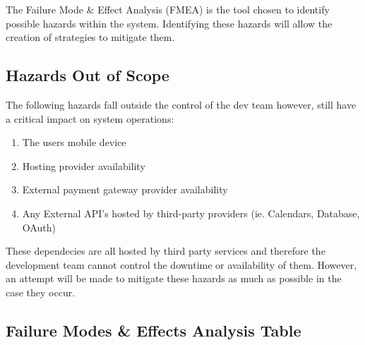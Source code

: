 \documentclass{article}
\begin{document}
The Failure Mode \& Effect Analysis (FMEA) is the tool chosen to identify possible hazards within the system. Identifying these hazards will allow the creation of strategies to mitigate them.

\subsection{Hazards Out of Scope}
The following hazards fall outside the control of the dev team however, still have a critical impact on system operations:
\begin{enumerate}
    \item The users mobile device
    \item Hosting provider availability
    \item External payment gateway provider availability
    \item Any External API's hosted by third-party providers (ie. Calendars, Database, OAuth)
\end{enumerate}
These dependecies are all hosted by third party services and therefore the development team cannot control the downtime or availability of them. However, an attempt will be made to mitigate these hazards as much as possible in the case they occur.

\subsection{Failure Modes \& Effects Analysis Table}
\end{document}
